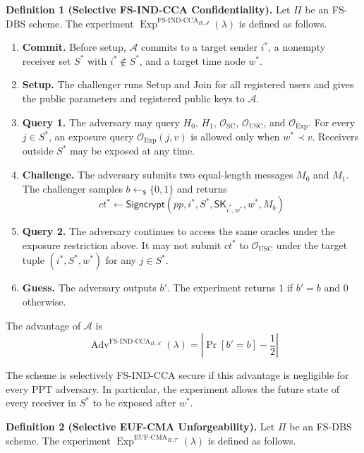 \documentclass[sigconf,anonymous]{acmart}
\theoremstyle{definition}
\theoremstyle{definition}
\theoremstyle{definition}
\theoremstyle{definition}
\theoremstyle{definition}
\theoremstyle{definition}
\theoremstyle{definition}
\theoremstyle{definition}
\theoremstyle{definition}
\newcommand{\getsr}{\leftarrow_{\$}}
\newcommand{\sample}{\getsr}
\begin{document}
\noindent\textbf{Definition 1 (Selective FS-IND-CCA Confidentiality).}
Let $\Pi$ be an FS-DBS scheme. The experiment
$\operatorname{Exp}^{\mathrm{FS\text{-}IND\text{-}CCA}_{\Pi,\mathcal{A}}}(\lambda)$
is defined as follows.

\begin{enumerate}
	\item \textbf{Commit.}
	Before setup, $\mathcal{A}$ commits to a target sender $i^*$, a nonempty receiver set $S^*$ with $i^*\notin S^*$, and a target time node $w^*$.
	
	\item \textbf{Setup.}
	The challenger runs \textsf{Setup} and \textsf{Join} for all registered users and gives the public parameters and registered public keys to $\mathcal{A}$.
	
	\item \textbf{Query 1.}
	The adversary may query $H_0$, $H_1$, $\mathcal{O}_{\mathrm{SC}}$, $\mathcal{O}_{\mathrm{USC}}$, and $\mathcal{O}_{\mathrm{Exp}}$. For every $j\in S^*$, an exposure query $\mathcal{O}_{\mathrm{Exp}}(j,v)$ is allowed only when $w^*\prec v$. Receivers outside $S^*$ may be exposed at any time.
	
	\item \textbf{Challenge.}
	The adversary submits two equal-length messages $M_0$ and $M_1$. The challenger samples $b\sample\{0,1\}$ and returns
	\[
	ct^* \leftarrow
	\textsf{Signcrypt}
	\left(
	pp,i^*,S^*,\mathsf{SK}_{i^*,w^*},w^*,M_b
	\right)
	\]
	
	\item \textbf{Query 2.}
	The adversary continues to access the same oracles under the exposure restriction above. It may not submit $ct^*$ to $\mathcal{O}_{\mathrm{USC}}$ under the target tuple $(i^*,S^*,w^*)$ for any $j\in S^*$.
	
	\item \textbf{Guess.}
	The adversary outputs $b'$. The experiment returns $1$ if $b'=b$ and $0$ otherwise.
\end{enumerate}

The advantage of $\mathcal{A}$ is
\[
\operatorname{Adv}^{\mathrm{FS\text{-}IND\text{-}CCA}_{\Pi,\mathcal{A}}}(\lambda)
=
\left|
\Pr[b'=b]-\frac{1}{2}
\right|
\]

The scheme is selectively FS-IND-CCA secure if this advantage is negligible for every PPT adversary. In particular, the experiment allows the future state of every receiver in $S^*$ to be exposed after $w^*$.

\noindent\textbf{Definition 2 (Selective EUF-CMA Unforgeability).}
Let $\Pi$ be an FS-DBS scheme. The experiment
$\operatorname{Exp}^{\mathrm{EUF\text{-}CMA}_{\Pi,\mathcal{F}}}(\lambda)$
is defined as follows.
\end{document}
